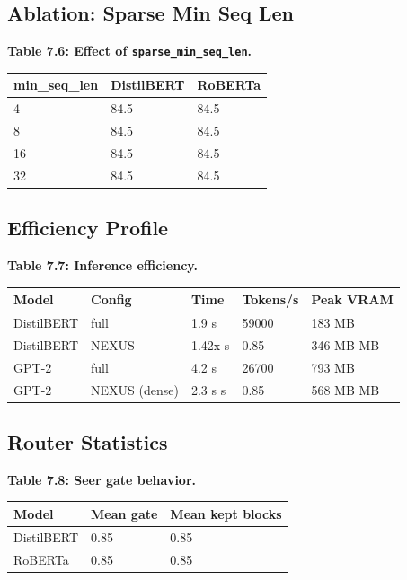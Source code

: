 \subsection{Ablation: Sparse Min Seq Len}

\textbf{Table 7.6: Effect of \texttt{sparse\_min\_seq\_len}.}

\begin{table}[H]
\centering
\small
\begin{tabular}{lll}
\toprule
\textbf{min\_seq\_len} & \textbf{DistilBERT} & \textbf{RoBERTa} \\
\midrule
4 & 84.5 & 84.5 \\
8 & 84.5 & 84.5 \\
16 & 84.5 & 84.5 \\
32 & 84.5 & 84.5 \\
\bottomrule
\end{tabular}
\end{table}

\subsection{Efficiency Profile}

\textbf{Table 7.7: Inference efficiency.}

\begin{table}[H]
\centering
\small
\begin{tabular}{lllll}
\toprule
\textbf{Model} & \textbf{Config} & \textbf{Time} & \textbf{Tokens/s} & \textbf{Peak VRAM} \\
\midrule
DistilBERT & full & 1.9 s & 59000 & 183 MB \\
DistilBERT & NEXUS & 1.42x s & 0.85 & 346 MB MB \\
GPT-2 & full & 4.2 s & 26700 & 793 MB \\
GPT-2 & NEXUS (dense) & 2.3 s s & 0.85 & 568 MB MB \\
\bottomrule
\end{tabular}
\end{table}

\subsection{Router Statistics}

\textbf{Table 7.8: Seer gate behavior.}

\begin{table}[H]
\centering
\small
\begin{tabular}{lll}
\toprule
\textbf{Model} & \textbf{Mean gate} & \textbf{Mean kept blocks} \\
\midrule
DistilBERT & 0.85 & 0.85 \\
RoBERTa & 0.85 & 0.85 \\
\bottomrule
\end{tabular}
\end{table}

